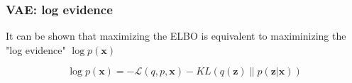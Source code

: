 \documentclass[final]{beamer}
\theoremstyle{plain}
\theoremstyle{definition}
\theoremstyle{remark}
\newcommand{\x}{\mathbf{x}}
\newcommand{\Z}{\mathbf{Z}}
\newcommand{\z}{\mathbf{z}}
\newcommand{\LL}{\mathcal{L}}
\newcommand{\bv}[1]{\boldsymbol{#1}}
\begin{document}
\begin{frame}
\frametitle{VAE: log evidence}

It can be shown that maximizing the ELBO is equivalent to 
maximinizing the "log evidence" $\log p(\x)$

{
\begin{equation}\label{eq:elbokl}
\log p(\bv{x}) = -\mathcal{L}(q,p,\x) - KL(q(\bv{z}) \| p(\bv{z}|\bv{x}))
\end{equation}
}


\end{frame}
\end{document}
